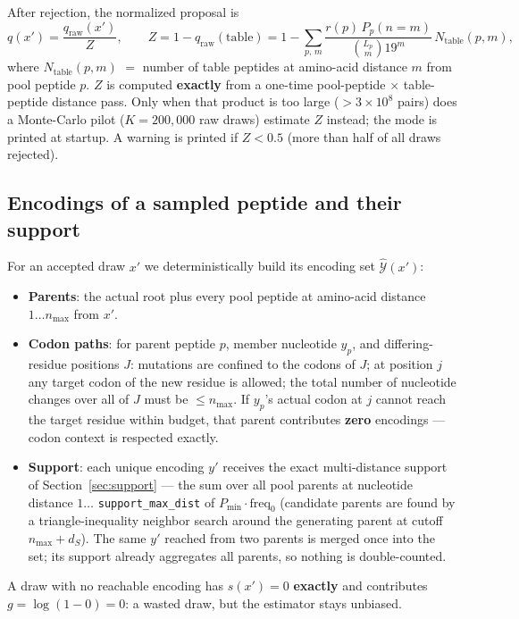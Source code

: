 \documentclass[11pt]{article}
\begin{document}
After rejection, the normalized proposal is
\begin{equation}\label{eq:z}
q(x') = \frac{q_{\text{raw}}(x')}{Z},
\qquad
Z = 1 - q_{\text{raw}}(\text{table})
= 1 - \sum_{p,\, m}
\frac{r(p)\, P_p(n=m)}{\binom{L_p}{m} 19^{m}} \, N_{\text{table}}(p, m),
\end{equation}
where $N_{\text{table}}(p, m)$ $=$ number of table peptides at amino-acid
distance $m$ from pool peptide $p$. $Z$ is computed \textbf{exactly} from
a one-time pool-peptide $\times$ table-peptide distance pass. Only when
that product is too large ($> 3\times10^8$ pairs) does a Monte-Carlo
pilot ($K = 200{,}000$ raw draws) estimate $Z$ instead; the mode is
printed at startup. A warning is printed if $Z < 0.5$ (more than half of
all draws rejected).

\subsection{Encodings of a sampled peptide and their support}\label{sec:encodings}

For an accepted draw $x'$ we deterministically build its encoding set
$\hat{\mathcal{Y}}(x')$:
\begin{itemize}
\item \textbf{Parents}: the actual root plus every pool peptide at
amino-acid distance $1 \dots n_{\max}$ from $x'$.
\item \textbf{Codon paths}: for parent peptide $p$, member nucleotide
$y_p$, and differing-residue positions $J$: mutations are confined to
the codons of $J$; at position $j$ any target codon of the new residue
is allowed; the total number of nucleotide changes over all of $J$ must
be $\le n_{\max}$. If $y_p$'s actual codon at $j$ cannot reach the
target residue within budget, that parent contributes \textbf{zero}
encodings --- codon context is respected exactly.
\item \textbf{Support}: each unique encoding $y'$ receives the exact
multi-distance support of Section~\ref{sec:support} --- the sum over all
pool parents at nucleotide distance $1 \dots$ \texttt{support\_max\_dist}
of $P_{\min} \cdot \text{freq}_0$ (candidate parents are found by a
triangle-inequality neighbor search around the generating parent at
cutoff $n_{\max} + d_S$). The same $y'$ reached from two parents is
merged once into the set; its support already aggregates all parents, so
nothing is double-counted.
\end{itemize}

A draw with no reachable encoding has $s(x') = 0$ \textbf{exactly} and
contributes $g = \log(1 - 0) = 0$: a wasted draw, but the estimator
stays unbiased.
\end{document}

